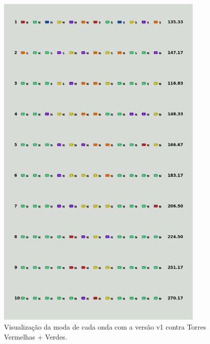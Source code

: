 \begin{figure}[H]
  \centering
  \includegraphics[width=0.9\textwidth]{figuras/td/td_redgreen_ai_mode_1_1.png}
  \caption{Visualização da moda de cada onda com a versão v1 contra Torres Vermelhas + Verdes.}
  \label{fig:td-moda-redgreen-1-1}
\end{figure}

